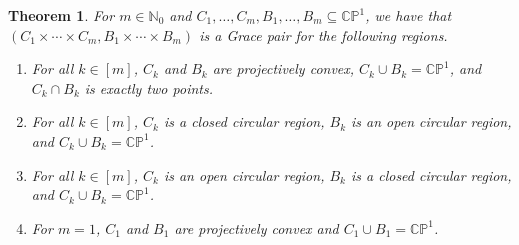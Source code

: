 \documentclass{article}
\newtheorem{theorem}{Theorem}[section]
\theoremstyle{definition}
\theoremstyle{plain}
\newcommand{\N}{\mathbb{N}}
\newcommand{\CP}{\mathbb{CP}}
\begin{document}
\begin{theorem}\label{grace_pairs_thm}
    For $m \in \N_0$ and $C_1,\ldots,C_m,B_1,\ldots,B_m \subseteq \CP^1$, we have that $(C_1 \times \cdots \times C_m, B_1 \times \cdots \times B_m)$ is a Grace pair for the following regions.
    \begin{enumerate}[label=(\roman*)]
        \item For all $k \in [m]$, $C_k$ and $B_k$ are projectively convex, $C_k \cup B_k = \CP^1$, and $C_k \cap B_k$ is exactly two points.
        \item For all $k \in [m]$, $C_k$ is a closed circular region, $B_k$ is an open circular region, and $C_k \cup B_k = \CP^1$.
        \item For all $k \in [m]$, $C_k$ is an open circular region, $B_k$ is a closed circular region, and $C_k \cup B_k = \CP^1$.
        \item For $m = 1$, $C_1$ and $B_1$ are projectively convex and $C_1 \cup B_1 = \CP^1$.
    \end{enumerate}
\end{theorem}
\end{document}
